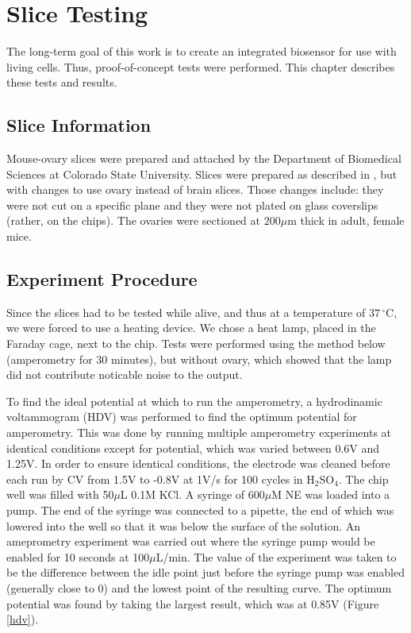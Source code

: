 \chapter{Slice Testing}

The long-term goal of this work is to create an integrated biosensor for use with living cells. Thus, proof-of-concept tests were performed. This chapter describes these tests and results.

\section{Slice Information}

Mouse-ovary slices were prepared and attached by the Department of Biomedical Sciences at Colorado State University. Slices were prepared as described in \cite{tobet2003vcm}, but with changes to use ovary instead of brain slices. Those changes include: they were not cut on a specific plane and they were not plated on glass coverslips (rather, on the chips). The ovaries were sectioned at $200 \mu \mathrm{m}$ thick in adult, female mice.

\section{Experiment Procedure}

Since the slices had to be tested while alive, and thus at a temperature of $37\,^{\circ}\mathrm{C}$, we were forced to use a heating device. We chose a heat lamp, placed in the Faraday cage, next to the chip. Tests were performed using the method below (amperometry for 30 minutes), but without ovary, which showed that the lamp did not contribute noticable noise to the output.

To find the ideal potential at which to run the amperometry, a hydrodinamic voltammogram (HDV) was performed to find the optimum potential for amperometry. This was done by running multiple amperometry experiments at identical conditions except for potential, which was varied between 0.6V and 1.25V. In order to ensure identical conditions, the electrode was cleaned before each run by CV from 1.5V to -0.8V at 1V/s for 100 cycles in $\mathrm{H}_2 \mathrm{SO}_4$. The chip well was filled with 50$\mu$L 0.1M KCl. A syringe of 600$\mu$M NE was loaded into a pump. The end of the syringe was connected to a pipette, the end of which was lowered into the well so that it was below the surface of the solution. An ameprometry experiment was carried out where the syringe pump would be enabled for 10 seconds at 100$\mu$L/min. The value of the experiment was taken to be the difference between the idle point just before the syringe pump was enabled (generally close to 0) and the lowest point of the resulting curve. The optimum potential was found by taking the largest result, which was at 0.85V (Figure \ref{hdv}).

